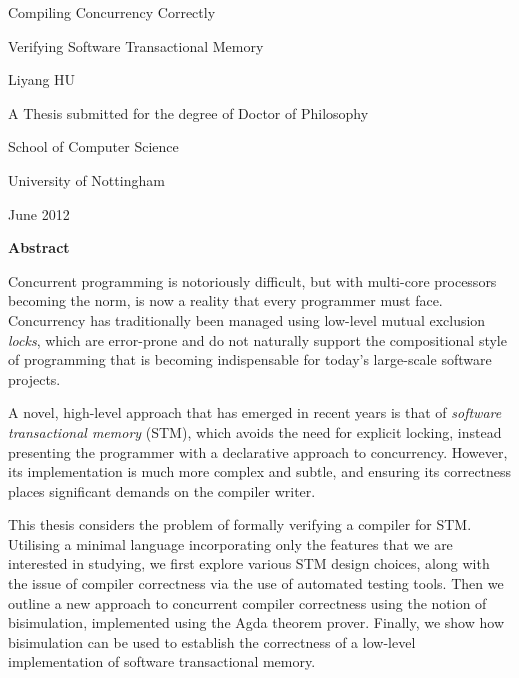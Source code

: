 \documentclass[12pt,twoside,openright]{book}
\begin{document}
\pagestyle{empty}
\begin{titlepage}
\begin{center}
\vspace*{1in}
{\LARGE Compiling Concurrency Correctly}
\par
{\Large Verifying Software Transactional Memory}
\par
\vspace{1.5in}
{\large Liyang HU}
\par
\vfill
A Thesis submitted for the degree of Doctor of Philosophy
\par
\vspace{0.5in}
School of Computer Science
\par
\vspace{0.5in}
University of Nottingham
\par
\vspace{0.5in}
June 2012
\end{center}
\cleardoublepage
\end{titlepage}


\pagestyle{fancy}

\begin{center}
{\large\bf Abstract}
\end{center}

Concurrent programming is notoriously difficult, but with multi-core
processors becoming the norm, is now a reality that every programmer must
face. Concurrency has traditionally been managed using low-level mutual
exclusion \emph{locks}, which are error-prone and do not naturally support
the compositional style of programming that is becoming indispensable for
today's large-scale software projects.

A novel, high-level approach that has emerged in recent years is that of
\emph{software transactional memory} (STM), which avoids the need for
explicit locking, instead presenting the programmer with a declarative
approach to concurrency. However, its implementation is much more complex
and subtle, and ensuring its correctness places significant demands on the
compiler writer.

This thesis considers the problem of formally verifying a compiler for STM.
Utilising a minimal language incorporating only the features that we are
interested in studying, we first explore various STM design choices, along
with the issue of compiler correctness via the use of automated testing
tools. Then we outline a new approach to concurrent compiler correctness
using the notion of bisimulation, implemented using the Agda theorem prover.
Finally, we show how bisimulation can be used to establish the correctness
of a low-level implementation of software transactional memory.
\end{document}
